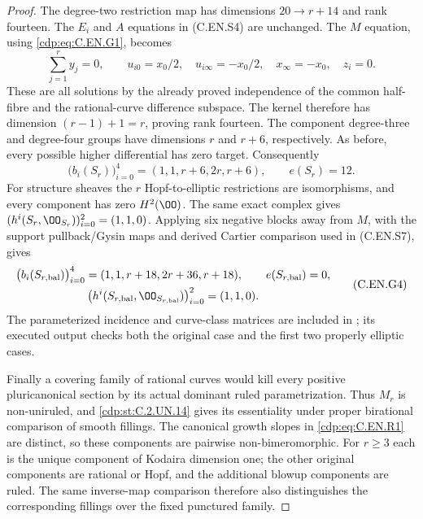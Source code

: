\begin{proof}
The degree-two restriction map has dimensions
$20\to r+14$ and rank fourteen. The $E_i$ and $A$
equations in (C.EN.S4) are unchanged. The $M$
equation, using \eqref{cdp:eq:C.EN.G1}, becomes
\[
 \sum_{j=1}^r y_j=0,\qquad
 u_{i0}=x_0/2,\quad u_{i\infty}=-x_0/2,\quad
 x_\infty=-x_0,\quad z_i=0.
                                                               \tag{C.EN.G2}\label{cdp:eq:C.EN.G2}
\]
These are all solutions by the already proved
independence of the common half-fibre and the
rational-curve difference subspace. The kernel
therefore has dimension $(r-1)+1=r$, proving
rank fourteen. The component degree-three and
degree-four groups have dimensions $r$ and $r+6$,
respectively. As before, every possible higher
differential has zero target. Consequently
\[
 \bigl(b_i(S_r)\bigr)_{i=0}^4=(1,1,r+6,2r,r+6),
 \qquad e(S_r)=12.
                                                               \tag{C.EN.G3}\label{cdp:eq:C.EN.G3}
\]
For structure sheaves the $r$ Hopf-to-elliptic
restrictions are isomorphisms, and every component
has zero $H^2(\OO)$. The same exact complex gives
$(h^i(S_r,\OO_{S_r}))_{i=0}^2=(1,1,0)$.
Applying six negative blocks away from $M$, with
the support pullback/Gysin maps and derived Cartier
comparison used in (C.EN.S7), gives
\[
 \begin{gathered}
 \bigl(b_i(S_{r,\mathrm{bal}})\bigr)_{i=0}^4
      =(1,1,r+18,2r+36,r+18),\qquad e(S_{r,\mathrm{bal}})=0,\\
 \bigl(h^i(S_{r,\mathrm{bal}},\OO_{S_{r,\mathrm{bal}}})\bigr)_{i=0}^2
      =(1,1,0).
 \end{gathered}                                                \tag{C.EN.G4}\label{cdp:eq:C.EN.G4}
\]
The parameterized incidence and curve-class matrices
are included in ; its
executed output checks both the original case and
the first two properly elliptic cases.


Finally a covering family of rational
curves would kill every positive
pluricanonical section by its actual
dominant ruled parametrization.
Thus $M_r$ is non-uniruled, and
\ref{cdp:st:C.2.UN.14} gives its essentiality under
proper birational comparison of
smooth fillings. The canonical
growth slopes in \eqref{cdp:eq:C.EN.R1} are
distinct, so these components
are pairwise non-bimeromorphic.
For $r\ge3$ each is the unique
component of Kodaira dimension
one; the other original components
are rational or Hopf, and the
additional blowup components are
ruled. The same inverse-map
comparison therefore also
distinguishes the corresponding
fillings over the fixed punctured
family.
\end{proof}


